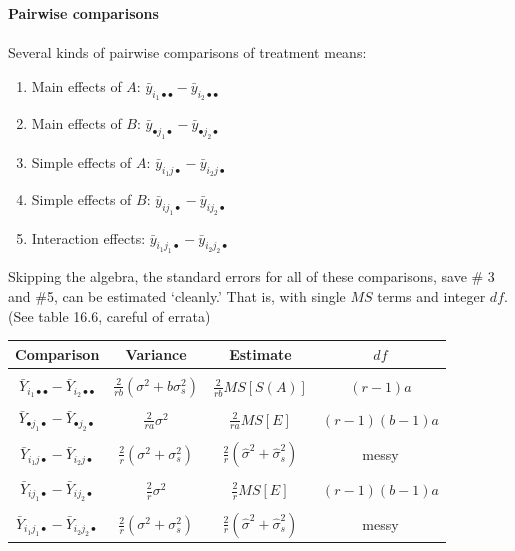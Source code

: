 \newpage
\textbf{Pairwise comparisons}\\~\\
Several kinds of pairwise comparisons of treatment means:
\begin{enumerate}
\item Main effects of $A$: $\bar{y}_{i_1\bullet\bullet} - \bar{y}_{i_2\bullet\bullet}$
\item Main effects of $B$: $\bar{y}_{\bullet j_1\bullet} - \bar{y}_{\bullet j_2\bullet}$
\item Simple effects of $A$: $\bar{y}_{i_1j\bullet} - \bar{y}_{i_2j\bullet}$
\item Simple effects of $B$: $\bar{y}_{ij_1\bullet} - \bar{y}_{ij_2\bullet}$
\item Interaction effects: $\bar{y}_{i_1j_1\bullet} - \bar{y}_{i_2j_2\bullet}$
\end{enumerate}


Skipping the algebra, the standard errors for all of these comparisons, save \# 3 and \#5, can be estimated `cleanly.'  That is, with single $MS$ terms and integer $df$.  (See table 16.6, careful of errata)

\begin{center}
\begin{tabular}{cccc} \hline
Comparison & Variance & Estimate & $df$ \\ \hline
& & & \\
$\bar{Y}_{i_1\bullet\bullet} - \bar{Y}_{i_2\bullet\bullet}$ & $\frac{2}{rb}(\sigma^2 + b \sigma_s^2)$ & $\frac{2}{rb}MS[S(A)]$ & $(r-1)a$ \\
& & & \\
$\bar{Y}_{\bullet j_1\bullet} - \bar{Y}_{\bullet j_2\bullet}$ & $\frac{2}{ra}\sigma^2$ & $\frac{2}{ra}MS[E]$ & $(r-1)(b-1)a$\\
& & & \\
$\bar{Y}_{i_1j\bullet} - \bar{Y}_{i_2j\bullet}$ & $\frac{2}{r}(\sigma^2 + \sigma_s^2)$ & $\frac{2}{r}(\hat\sigma^2 + \hat\sigma_s^2)$ & messy \\
& & & \\
$\bar{Y}_{ij_1\bullet} - \bar{Y}_{ij_2\bullet}$ & $\frac{2}{r}\sigma^2$ & $\frac{2}{r}MS[E]$ & $(r-1)(b-1)a$\\
& & & \\
$\bar{Y}_{i_1j_1\bullet} - \bar{Y}_{i_2j_2\bullet}$ & $\frac{2}{r}(\sigma^2 + \sigma_s^2)$ & $\frac{2}{r}(\hat\sigma^2 + \hat\sigma_s^2)$ & messy \\ \hline
\end{tabular}
\end{center}

